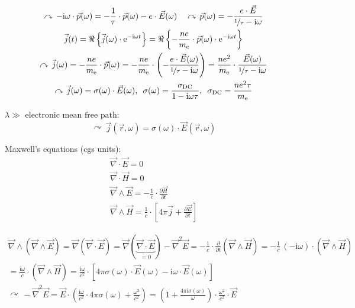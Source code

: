 \documentclass[fontsize=11pt,a4paper]{scrartcl}
\begin{document}
\begin{gather*}
	\curvearrowright\,-\mathrm{i}\omega\cdot\vec p(\omega)=-\frac{1}{\tau}\cdot\vec p(\omega)-e\cdot\vec E(\omega)\quad\curvearrowright\,\vec p(\omega)=-\frac{e\cdot\vec E}{\nicefrac{1}{\tau}-\mathrm{i}\omega}\\
	\vec j(t)=\Re\left\{\vec j(\omega)\cdot\mathrm{e}^{-\mathrm{i}\omega t}\right\}=\Re\left\{-\frac{ne}{m_\mathrm{e}}\cdot\vec p(\omega)\cdot\mathrm{e}^{-\mathrm{i}\omega t}\right\}\\
	\curvearrowright\,\vec j(\omega)=-\frac{ne}{m_\mathrm{e}}\cdot\vec p(\omega)=-\frac{ne}{m_\mathrm{e}}\cdot\left(-\frac{e\cdot\vec E(\omega)}{\nicefrac{1}{\tau}-\mathrm{i}\omega}\right)=\frac{ne^2}{m_\mathrm{e}}\cdot\frac{\vec E(\omega)}{\nicefrac{1}{\tau}-\mathrm{i}\omega}\\
	\curvearrowright\,\vec j(\omega)=\sigma(\omega)\cdot\vec E(\omega),\,\,\,\sigma(\omega)=\frac{\sigma_\mathrm{DC}}{1-\mathrm{i}\omega\tau},\,\,\,\sigma_\mathrm{DC}=\frac{ne^2\tau}{m_\mathrm{e}}
\end{gather*}

$\lambda\gg\text{ electronic mean free path}$:
\[
	\curvearrowright\,\vec j(\vec r,\omega)=\sigma(\omega)\cdot\vec E(\vec r,\omega)
\]

Maxwell's equations (cgs units):
\begin{gather*}
	\vec\nabla\cdot\vec E=0\\
	\vec\nabla\cdot\vec H=0\\
	\vec\nabla\wedge\vec E=-\frac{1}{c}\cdot\frac{\partial\vec H}{\partial t}\\
	\vec\nabla\wedge\vec H=\frac{1}{c}\cdot\left[4\pi\vec j+\frac{\partial\vec E}{\partial t}\right]
\end{gather*}

\begin{gather*}
	\vec\nabla\wedge(\vec\nabla\wedge\vec E)=\vec\nabla(\vec\nabla\cdot\vec E)=\vec\nabla(\underbrace{\vec\nabla\cdot\vec E}_{=0})-\vec\nabla^2\vec E=-\frac{1}{c}\cdot\frac{\partial}{\partial t}(\vec\nabla\wedge\vec H)=-\frac{1}{c}\,(-\mathrm{i}\omega)\cdot(\vec\nabla\wedge\vec H)\\
	=\frac{\mathrm{i}\omega}{c}\cdot(\vec\nabla\wedge\vec H)=\frac{\mathrm{i}\omega}{c^2}\cdot\left[4\pi\sigma(\omega)\cdot\vec E(\omega)-\mathrm{i}\omega\cdot\vec E(\omega)\right]\\
	\curvearrowright\,-\vec\nabla^2\vec E=\vec E\cdot\left(\frac{\mathrm{i}\omega}{c^2}\cdot 4\pi\sigma(\omega)+\frac{\omega^2}{c^2}\right)=\left(1+\frac{4\pi\mathrm{i}\sigma(\omega)}{\omega}\right)\cdot\frac{\omega^2}{c^2}\cdot\vec E
\end{gather*}
\end{document}
